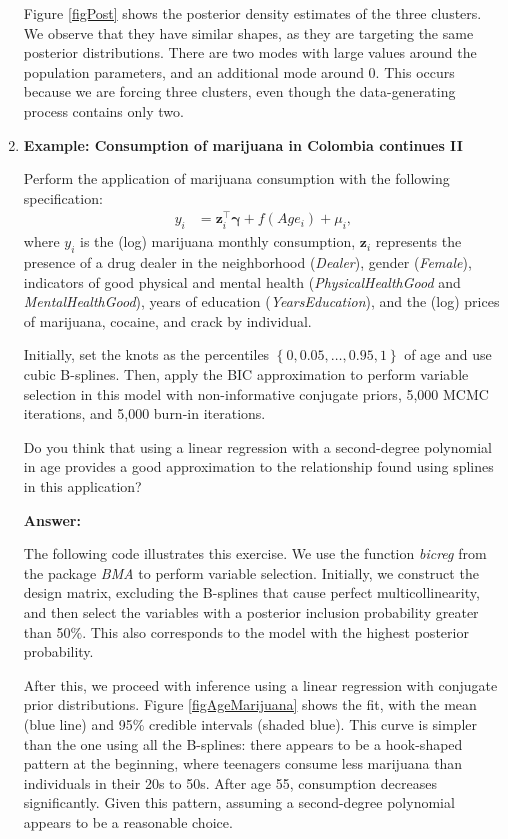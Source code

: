 \begin{enumerate}[leftmargin=*]
Figure \ref{figPost} shows the posterior density estimates of the three clusters. We observe that they have similar shapes, as they are targeting the same posterior distributions. There are two modes with large values around the population parameters, and an additional mode around 0. This occurs because we are forcing three clusters, even though the data-generating process contains only two.

	\item \textbf{Example: Consumption of marijuana in Colombia continues II}

Perform the application of marijuana consumption with the following specification:
\begin{align*}
	y_i & = \boldsymbol{z}_i^{\top} \boldsymbol{\gamma} + f(Age_{i}) + \mu_i,
\end{align*}
where $y_i$ is the (log) marijuana monthly consumption, $\boldsymbol{z}_i$ represents the presence of a drug dealer in the neighborhood (\textit{Dealer}), gender (\textit{Female}), indicators of good physical and mental health (\textit{PhysicalHealthGood} and \textit{MentalHealthGood}), years of education (\textit{YearsEducation}), and the (log) prices of marijuana, cocaine, and crack by individual.

Initially, set the knots as the percentiles $\left\{0,0.05,\dots,0.95,1\right\}$ of age and use cubic B-splines. Then, apply the BIC approximation to perform variable selection in this model with non-informative conjugate priors, 5,000 MCMC iterations, and 5,000 burn-in iterations.

Do you think that using a linear regression with a second-degree polynomial in age provides a good approximation to the relationship found using splines in this application?

\textbf{Answer:}

The following code illustrates this exercise. We use the function \textit{bicreg} from the package \textit{BMA} to perform variable selection. Initially, we construct the design matrix, excluding the B-splines that cause perfect multicollinearity, and then select the variables with a posterior inclusion probability greater than 50\%. This also corresponds to the model with the highest posterior probability.

After this, we proceed with inference using a linear regression with conjugate prior distributions. Figure \ref{figAgeMarijuana} shows the fit, with the mean (blue line) and 95\% credible intervals (shaded blue). This curve is simpler than the one using all the B-splines: there appears to be a hook-shaped pattern at the beginning, where teenagers consume less marijuana than individuals in their 20s to 50s. After age 55, consumption decreases significantly. Given this pattern, assuming a second-degree polynomial appears to be a reasonable choice.


\end{enumerate}
